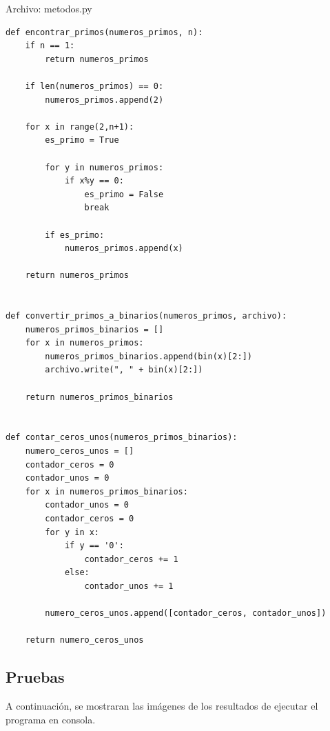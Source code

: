 \documentclass[12pt]{article}
\begin{document}
\vspace{1em}

Archivo: metodos.py
\lstset{language=Python, breaklines=true, basicstyle=\footnotesize}
\begin{lstlisting}[frame=single]
def encontrar_primos(numeros_primos, n):
    if n == 1:
        return numeros_primos

    if len(numeros_primos) == 0:
        numeros_primos.append(2)

    for x in range(2,n+1):
        es_primo = True

        for y in numeros_primos:
            if x%y == 0:
                es_primo = False
                break

        if es_primo:
            numeros_primos.append(x)

    return numeros_primos


def convertir_primos_a_binarios(numeros_primos, archivo):
    numeros_primos_binarios = []
    for x in numeros_primos:
        numeros_primos_binarios.append(bin(x)[2:])
        archivo.write(", " + bin(x)[2:])

    return numeros_primos_binarios


def contar_ceros_unos(numeros_primos_binarios):
    numero_ceros_unos = []
    contador_ceros = 0
    contador_unos = 0
    for x in numeros_primos_binarios:
        contador_unos = 0
        contador_ceros = 0
        for y in x:
            if y == '0':
                contador_ceros += 1
            else:
                contador_unos += 1

        numero_ceros_unos.append([contador_ceros, contador_unos])

    return numero_ceros_unos

\end{lstlisting}

\subsection{Pruebas}
A continuación, se mostraran las imágenes de los resultados de ejecutar el programa en consola.\\
\end{document}

